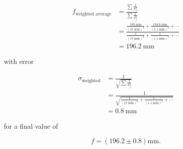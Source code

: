 \begin{align*}
    f_\text{weighted average} &= \frac{\sum \frac{f}{\sigma_f^2}}{\sum \frac{1}{\sigma_f^2}} \\
    &= \frac{\frac{\qty{195}{\milli\metre}}{\left(\qty{17}{\milli\metre}\right)^2} + \frac{\qty{194.6}{\milli\metre}}{\left(\qty{1.1}{\milli\metre}\right)^2} + \cdots}{\frac{1}{\left(\qty{17}{\milli\metre}\right)^2} + \frac{1}{\left(\qty{1.1}{\milli\metre}\right)^2} + \cdots} \\
    &= \qty{196.2}{\milli\metre}
\end{align*}

with error 

\begin{align*}
    \sigma_\text{weighted} &= \frac{1}{\sqrt{\sum \frac{1}{\sigma_f^2}}} \\
    &= \frac{1}{\sqrt{\frac{1}{\left(\qty{17}{\milli\metre}\right)^2} + \frac{1}{\left(\qty{1.1}{\milli\metre}\right)^2} + \cdots}} \\
    &= \qty{0.8}{\milli\metre}
\end{align*}

for a final value of

\[f = (196.2 \pm 0.8) \unit{\milli\metre}.\]